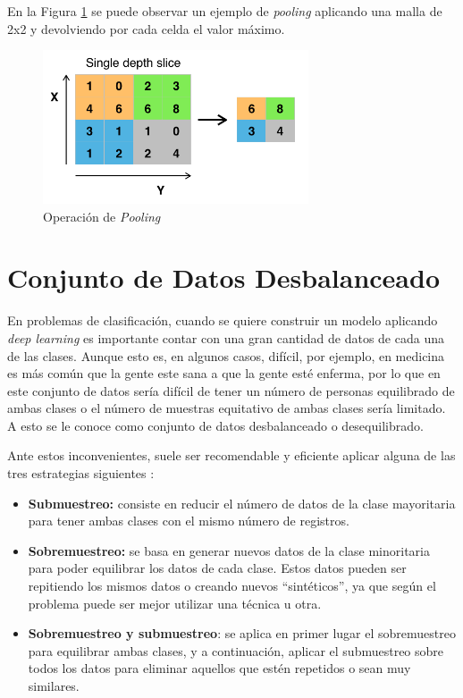 En la Figura \ref{f:pooling} se puede observar un ejemplo de \emph{pooling} aplicando una malla de 2x2 y devolviendo por cada celda el valor máximo.

\begin{figure}[h]
 \centering
  \includegraphics[width=0.7\textwidth]{img/pooling.png}
 \caption{Operación de \emph{Pooling} \cite{wiki:pooling}}
 \label{f:pooling}
\end{figure}

\section{Conjunto de Datos Desbalanceado}
En problemas de clasificación, cuando se quiere construir un modelo aplicando \emph{deep learning} es importante contar con una gran cantidad de datos de cada una de las clases. Aunque esto es, en algunos casos, difícil, por ejemplo, en medicina es más común que la gente este sana a que la gente esté enferma, por lo que en este conjunto de datos sería difícil de tener un número de personas equilibrado de ambas clases o el número de muestras equitativo de ambas clases sería limitado. A esto se le conoce como conjunto de datos desbalanceado o desequilibrado.

Ante estos inconvenientes, suele ser recomendable y eficiente aplicar alguna de las tres estrategias siguientes \cite{Na8_2020}:
\begin{itemize}
    \item \textbf{Submuestreo:} consiste en reducir el número de datos de la clase mayoritaria para tener ambas clases con el mismo número de registros.
    \item \textbf{Sobremuestreo:} se basa en generar nuevos datos de la clase minoritaria para poder equilibrar los datos de cada clase. Estos datos pueden ser repitiendo los mismos datos o creando nuevos ``sintéticos'', ya que según el problema puede ser mejor utilizar una técnica u otra.
    \item \textbf{Sobremuestreo y submuestreo}: se aplica en primer lugar el sobremuestreo para equilibrar ambas clases, y a continuación, aplicar el submuestreo sobre todos los datos para eliminar aquellos que estén repetidos o sean muy similares.
\end{itemize}

